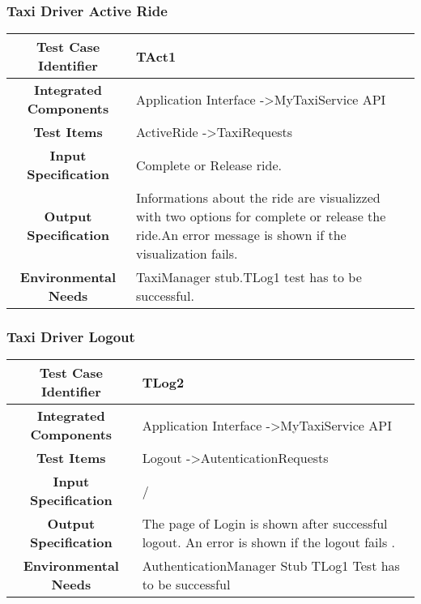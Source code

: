 \documentclass[11pt, a4paper,titlepage]{article}
\begin{document}
	\subsubsection{Taxi Driver Active Ride }
	\begin{tabularx}{\textwidth}{| c|X|}
		\hline \textbf{Test Case Identifier} & TAct1 \\
		\hline \textbf{Integrated Components} & Application Interface -\textgreater MyTaxiService API \\
		\hline \textbf{Test Items} & ActiveRide -\textgreater TaxiRequests \\
		\hline \textbf{Input Specification} & Complete or Release ride. \\
		\hline \textbf{Output Specification} & Informations about the ride are visualizzed with two options for complete or release the ride.\newline An error message is shown if the visualization fails. \\
		\hline \textbf{Environmental Needs} & TaxiManager stub.\newline TLog1 test has to be successful. \\
		\hline
	\end{tabularx}
	\newline
	\newline
	\subsubsection{Taxi Driver Logout}
	\begin{tabularx}{\textwidth}{| c|X|}
		\hline \textbf{Test Case Identifier} & TLog2 \\
		\hline \textbf{Integrated Components} & Application Interface -\textgreater MyTaxiService API \\
		\hline \textbf{Test Items} & Logout -\textgreater AutenticationRequests \\
		\hline \textbf{Input Specification} & / \\
		\hline \textbf{Output Specification} & 
		The page of Login is shown after successful logout.\newline
		An error is shown if the logout fails .\\
		\hline \textbf{Environmental Needs} & AuthenticationManager Stub \newline	TLog1 Test has to be successful \\
		\hline
	\end{tabularx}
	\newline
	\newline
\end{document}
